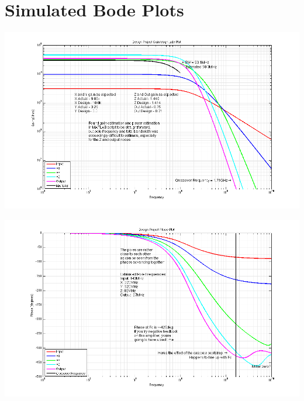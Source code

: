 \documentclass[12pt,a4paper]{article}
\begin{document}
\pagebreak



\section{Simulated Bode Plots}

\centering
\includegraphics[width=\textwidth]{mag.png}

\centering
\includegraphics[width=\textwidth]{phase.png}

\pagebreak
\end{document}
